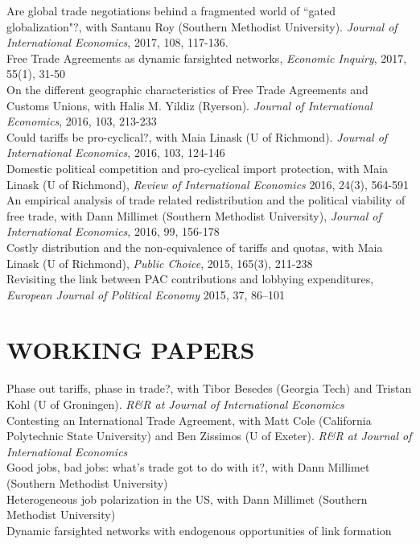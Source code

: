 \documentclass[11pt]{res}
\begin{document}
\begin{resume}
{Are global trade negotiations behind a fragmented world of ``gated globalization"?}, with Santanu Roy (Southern Methodist University). \emph{Journal of International Economics}, 2017, 108, 117-136.\vspace{1.5mm}\\
{ Free Trade Agreements as dynamic farsighted networks}, \emph{Economic Inquiry}, 2017, 55(1), 31-50\vspace{1.5mm}\\
{On the different geographic characteristics of Free Trade Agreements and Customs Unions}, with Halis M. Yildiz (Ryerson). \emph{Journal of International Economics}, 2016, 103, 213-233 \vspace{1.5mm}\\
{Could tariffs be pro-cyclical?}, with Maia Linask (U of Richmond). \emph{Journal of International Economics}, 2016, 103, 124-146 \vspace{1.5mm}\\
{Domestic political competition and pro-cyclical import protection}, with Maia Linask (U of Richmond), \emph{Review of International Economics} 2016, 24(3), 564-591\vspace{1.5mm}\\
{An empirical analysis of trade related redistribution and the political viability of free trade}, with Dann Millimet (Southern Methodist University), \emph{Journal of International Economics}, 2016, 99, 156-178 \vspace{1.5mm}\\
{Costly distribution and the non-equivalence of tariffs and quotas}, with Maia Linask (U of Richmond), \emph{Public Choice}, 2015, 165(3), 211-238 \vspace{1.5mm}\\
{Revisiting the link between PAC contributions and lobbying expenditures, \emph{European Journal of Political Economy}} 2015, 37, 86--101

\section{WORKING PAPERS}\vspace{1.5mm}
Phase out tariffs, phase in trade?, with Tibor Besedes (Georgia Tech) and Tristan Kohl (U of Groningen). \emph{R\&R at Journal of International Economics}\vspace{1.5mm}\\
{Contesting an International Trade Agreement}, with Matt Cole (California Polytechnic State University) and Ben Zissimos (U of Exeter). \emph{R\&R at Journal of International Economics}\vspace{1.5mm}\\
{Good jobs, bad jobs: what's trade got to do with it?}, with Dann Millimet (Southern Methodist University)\vspace{1.5mm}\\
{Heterogeneous job polarization in the US}, with Dann Millimet (Southern Methodist University)\vspace{1.5mm}\\
{Dynamic farsighted networks with endogenous opportunities of link formation}


\end{resume}
\end{document}
